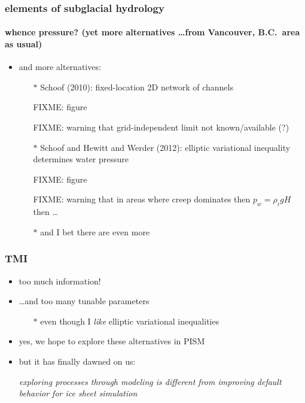 \documentclass[hide notes,intlimits]{beamer}
\begin{document}
\begin{frame}
  \frametitle{elements of subglacial hydrology}
  \framesubtitle{whence pressure? (yet more alternatives \dots from Vancouver, B.C.~area as usual)}

\begin{itemize}
  \item and more alternatives:
  \begin{itemize}
  \item[$\ast$]  Schoof (2010): fixed-location 2D network of channels
  
  FIXME: figure 
  
  FIXME: warning that grid-independent limit not known/available (?)

  \item[$\ast$]  Schoof and Hewitt and Werder (2012): elliptic variational inequality determines water pressure

  FIXME: figure 
  
  FIXME: warning that in areas where creep dominates then $p_w = \rho_i g H$ then \dots

  \item[$\ast$] and I bet there are even more

  \end{itemize}

\end{itemize}

\end{frame}



\begin{frame}
  \frametitle{TMI}

  \begin{itemize}
  \item too much information!
  \item \dots and too many tunable parameters
    \begin{itemize}
    \item[$\ast$] even though I \emph{like} elliptic variational inequalities
    \end{itemize}
  \item yes, we hope to explore these alternatives in PISM
  \item but it has finally dawned on us:
  
  \begin{center}
  \emph{exploring processes through modeling is different from improving default behavior for ice sheet simulation}
  \end{center}
  \end{itemize}
\end{frame}
\end{document}
